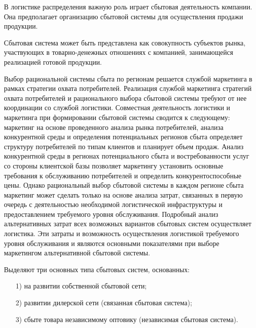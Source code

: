 В логистике распределения важную роль играет сбытовая деятельность компании.
Она предполагает организацию сбытовой системы для осуществления продажи продукции.

Сбытовая система может быть представлена как совокупность субъектов рынка, участвующих в товарно-денежных отношениях с компанией, занимающейся реализацией готовой продукции.

Выбор рациональной системы сбыта по регионам решается службой маркетинга в рамках стратегии охвата потребителей.
Реализация службой маркетинга стратегий охвата  потребителей и рационального выбора сбытовой системы требуют от нее координации со службой логистики.
Совместная деятельность логистики и маркетинга при формировании сбытовой системы сводится к следующему: маркетинг на основе проведенного анализа рынка потребителей, анализа конкурентной среды и определения потенциальных регионов сбыта определяет структуру потребителей по типам клиентов и планирует объем продаж.
Анализ конкурентной среды в регионах потенциального сбыта и востребованности услуг со стороны клиентской базы позволяет маркетингу установить основные требования к обслуживанию потребителей и определить конкурентоспособные цены.
Однако рациональный выбор сбытовой системы в каждом регионе сбыта маркетинг может сделать только на основе анализа затрат, связанных в первую очередь с деятельностью необходимой логистической инфраструктуры и предоставлением требуемого уровня обслуживания.
Подробный анализ альтернативных затрат всех возможных вариантов сбытовых систем осуществляет логистика.
Эти затраты и возможность осуществления логистикой требуемого уровня обслуживания и являются основными показателями при выборе маркетингом альтернативной сбытовой системы.

Выделяют три основных типа сбытовых систем, основанных:
\begin{enumerate}
	\item [1)] на развитии собственной сбытовой сети;
	\item [2)] развитии дилерской сети (связанная сбытовая система);
	\item [3)] сбыте товара независимому оптовику (независимая сбытовая система).
\end{enumerate}
\cite[с. 251--254 ]{dybskaya}
















